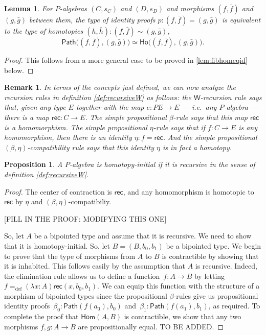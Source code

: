 \documentclass[10pt,a4paper,oneside,reqno]{amsart}
\numberwithin{equation}{section}
\theoremstyle{mythm}
\newtheorem{lemma}[theorem]{Lemma}
\newtheorem{proposition}[theorem]{Proposition}
\theoremstyle{mydef}
\theoremstyle{myrmk}
\newtheorem{remark}[theorem]{Remark}
\newcommand{\defeq}{=_{\mathrm{def}}}
\newcommand{\co}{\colon}
\newcommand{\Id}{\mathsf{Path}}
\newcommand{\W}{\mathsf{W}}
\newcommand{\rec}{\mathsf{rec}}
\newcommand{\Hom}{\mathsf{Hom}}
\newcommand{\Ho}{\mathsf{Ho}}
\begin{document}
\begin{lemma}\label{IdEqHo}
For $P$-algebras $(C,s_C)$ and $(D,s_D)$ and morphisms $(f, \bar{f})$ and $(g, \bar{g})$ between them, the type of identity proofs $p : (f, \bar{f}) = (g, \bar{g})$ is equivalent to the type of homotopies $(h, \bar{h}) : (f, \bar{f}) \sim (g, \bar{g})$,
\[
\Id\big((f, \bar{f}), (g, \bar{g})\big) \simeq \Ho\big((f, \bar{f}), (g, \bar{g})\big).
\]
\end{lemma}

\begin{proof}
This follows from a more general case to be proved in \ref{lem:fibhomeqid} below.
\end{proof}

\begin{remark}\label{rem:explainrules}
In terms of the concepts just defined, we can now analyze the recursion rules in definition \ref{def:recursiveW} as follows: the $\W$-recursion rule says that, given any type $E$ together with the map $e : PE\to E$ --- i.e.\ any $P$-algebra --- there is a map $\rec : C\to E$.  The simple propositional $\beta$-rule says that this map $\rec$ is a homomorphism.  The simple propositional $\eta$-rule says that if $f : C\to E$ is any homomorphism, then there is an identity $\eta : f = \rec$.  And the simple propositional $(\beta, \eta)$-compatibility rule says that this identity $\eta$ is in fact a homotopy.
\end{remark}

\begin{proposition}\label{prop:Wrec2hinit}
A $P$-algebra is homotopy-initial if it is recursive in the sense of definition \ref{def:recursiveW}.
\end{proposition}

\begin{proof}
The center of contraction is $\rec$, and any homomorphism is homotopic to $\rec$ by $\eta$ and $(\beta,\eta)$-compatibiliy.

[FILL IN THE PROOF: MODIFYING THIS ONE]

So, let $A$ be a bipointed type
and assume that it is recursive. We need to show that it is homotopy-initial. So, let $B = (B, b_0, b_1)$ be a bipointed type. We begin to prove
that the type of morphisms from $A$ to $B$ is contractible by showing that it is inhabited. This follows easily by the assumption that $A$
is recursive. Indeed, the elimination rule allows us to define a function~$f \co A \to B$ by letting~$f \defeq (\lambda x \co A) \rec(x, b_0, b_1)$. We can
equip this function with the structure of a morphism of bipointed types since the propositional $\beta$-rules give us propositional identity 
proofs~$\beta_0 \co \Id(f (a_0), b_0)$ and~$\beta_1 \co \Id (f(a_1), b_1)$, as required. To complete the proof that $\Hom(A,B)$ is contractible,
we show that any two morphisms $f, g \co A \to B$ are propositionally equal.  TO BE ADDED.
\end{proof}
\end{document}
